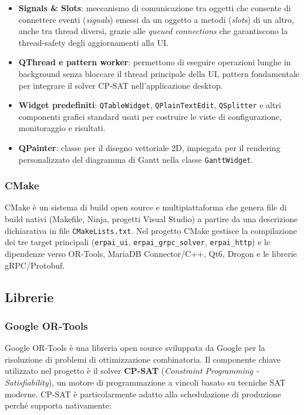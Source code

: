 \begin{itemize}
    \item \textbf{Signals \& Slots}: meccanismo di comunicazione tra oggetti che consente di connettere eventi (\textit{signals}) emessi da un oggetto a metodi (\textit{slots}) di un altro, anche tra thread diversi, grazie alle \textit{queued connections} che garantiscono la thread-safety degli aggiornamenti alla UI.
    \item \textbf{QThread e pattern worker}: permettono di eseguire operazioni lunghe in background senza bloccare il thread principale della UI, pattern fondamentale per integrare il solver CP-SAT nell'applicazione desktop.
    \item \textbf{Widget predefiniti}: \texttt{QTableWidget}, \texttt{QPlainTextEdit}, \texttt{QSplitter} e altri componenti grafici standard usati per costruire le viste di configurazione, monitoraggio e risultati.
    \item \textbf{QPainter}: classe per il disegno vettoriale 2D, impiegata per il rendering personalizzato del diagramma di Gantt nella classe \texttt{GanttWidget}.
\end{itemize}

\subsubsection{CMake}

CMake è un sistema di build open source e multipiattaforma che genera file di build nativi (Makefile, Ninja, progetti Visual Studio) a partire da una descrizione dichiarativa in file \texttt{CMakeLists.txt}. Nel progetto CMake gestisce la compilazione dei tre target principali (\texttt{erpai\_ui}, \texttt{erpai\_grpc\_solver}, \texttt{erpai\_http}) e le dipendenze verso OR-Tools, MariaDB Connector/C++, Qt6, Drogon e le librerie gRPC/Protobuf.

\subsection{Librerie}
\label{subsec:librerie}

\subsubsection{Google OR-Tools}

Google OR-Tools è una libreria open source sviluppata da Google per la risoluzione di problemi di ottimizzazione combinatoria. Il componente chiave utilizzato nel progetto è il solver \textbf{CP-SAT} (\textit{Constraint Programming - Satisfiability}), un motore di programmazione a vincoli basato su tecniche SAT moderne. CP-SAT è particolarmente adatto alla schedulazione di produzione perché supporta nativamente:

